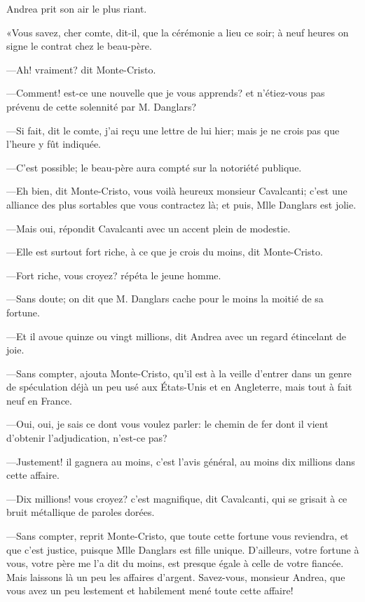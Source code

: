 Andrea prit son air le plus riant. 

«Vous savez, cher comte, dit-il, que la cérémonie a lieu ce soir; à neuf heures on signe le contrat chez le beau-père. 

—Ah! vraiment? dit Monte-Cristo. 

—Comment! est-ce une nouvelle que je vous apprends? et n'étiez-vous pas prévenu de cette solennité par M. Danglars? 

—Si fait, dit le comte, j'ai reçu une lettre de lui hier; mais je ne crois pas que l'heure y fût indiquée. 

—C'est possible; le beau-père aura compté sur la notoriété publique. 

—Eh bien, dit Monte-Cristo, vous voilà heureux monsieur Cavalcanti; c'est une alliance des plus sortables que vous contractez là; et puis, Mlle Danglars est jolie. 

—Mais oui, répondit Cavalcanti avec un accent plein de modestie. 

—Elle est surtout fort riche, à ce que je crois du moins, dit Monte-Cristo. 

—Fort riche, vous croyez? répéta le jeune homme. 

—Sans doute; on dit que M. Danglars cache pour le moins la moitié de sa fortune. 

—Et il avoue quinze ou vingt millions, dit Andrea avec un regard étincelant de joie. 

—Sans compter, ajouta Monte-Cristo, qu'il est à la veille d'entrer dans un genre de spéculation déjà un peu usé aux États-Unis et en Angleterre, mais tout à fait neuf en France. 

—Oui, oui, je sais ce dont vous voulez parler: le chemin de fer dont il vient d'obtenir l'adjudication, n'est-ce pas? 

—Justement! il gagnera au moins, c'est l'avis général, au moins dix millions dans cette affaire. 

—Dix millions! vous croyez? c'est magnifique, dit Cavalcanti, qui se grisait à ce bruit métallique de paroles dorées. 

—Sans compter, reprit Monte-Cristo, que toute cette fortune vous reviendra, et que c'est justice, puisque Mlle Danglars est fille unique. D'ailleurs, votre fortune à vous, votre père me l'a dit du moins, est presque égale à celle de votre fiancée. Mais laissons là un peu les affaires d'argent. Savez-vous, monsieur Andrea, que vous avez un peu lestement et habilement mené toute cette affaire! 

